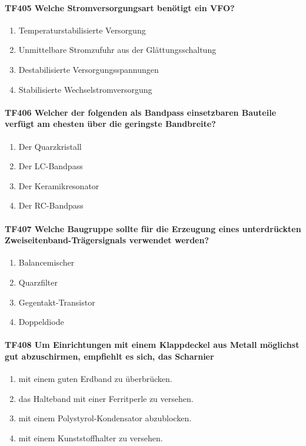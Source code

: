 \documentclass[8pt]{article}
\begin{document}
\paragraph*{TF405 Welche Stromversorgungsart benötigt ein VFO?}
\begin{enumerate}[nolistsep,label=\Alph*]
\item Temperaturstabilisierte Versorgung
\item Unmittelbare Stromzufuhr aus der Glättungsschaltung
\item Destabilisierte Versorgungsspannungen
\item Stabilisierte Wechselstromversorgung
\end{enumerate}

\paragraph*{TF406 Welcher der folgenden als Bandpass einsetzbaren Bauteile verfügt am ehesten über die geringste Bandbreite?}
\begin{enumerate}[nolistsep,label=\Alph*]
\item Der Quarzkristall
\item Der LC-Bandpass
\item Der Keramikresonator
\item Der RC-Bandpass
\end{enumerate}

\paragraph*{TF407 Welche Baugruppe sollte für die Erzeugung eines unterdrückten Zweiseitenband-Trägersignals verwendet werden?}
\begin{enumerate}[nolistsep,label=\Alph*]
\item Balancemischer
\item Quarzfilter
\item Gegentakt-Transistor
\item Doppeldiode
\end{enumerate}

\paragraph*{TF408 Um Einrichtungen mit einem Klappdeckel aus Metall möglichst gut abzuschirmen, empfiehlt es sich, das Scharnier} 
\begin{enumerate}[nolistsep,label=\Alph*]
\item mit einem guten Erdband zu überbrücken.
\item das Halteband mit einer Ferritperle zu versehen.
\item mit einem Polystyrol-Kondensator abzublocken.
\item mit einem Kunststoffhalter zu versehen.
\end{enumerate}
\end{document}
